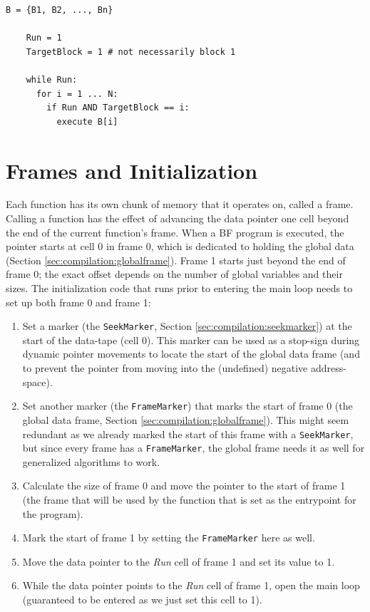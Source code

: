 \begin{lstfloat}[H]
  \begin{lstlisting}[style=pseudocode]
    B = {B1, B2, ..., Bn}

    Run = 1
    TargetBlock = 1 # not necessarily block 1

    while Run:
      for i = 1 ... N:
        if Run AND TargetBlock == i:
          execute B[i] 
  \end{lstlisting}
  \caption{Pseudocode of an Acus-generated program.}
  \label{lst:acusprogram}
\end{lstfloat}

\section{Frames and Initialization}
\label{sec:compilation:framesinit}
Each function has its own chunk of memory that it operates on, called a frame. Calling a function has the effect of advancing the data pointer one cell beyond the end of the current function's frame. When a BF program is executed, the pointer starts at cell 0 in frame 0, which is dedicated to holding the global data (Section \ref{sec:compilation:globalframe}). Frame 1 starts just beyond the end of frame 0; the exact offset depends on the number of global variables and their sizes. The initialization code that runs prior to entering the main loop needs to set up both frame 0 and frame 1:
%
\begin{enumerate}
\item Set a marker (the \texttt{SeekMarker}, Section \ref{sec:compilation:seekmarker}) at the start of the data-tape (cell 0). This marker can be used as a stop-sign during dynamic pointer movements to locate the start of the global data frame (and to prevent the pointer from moving into the (undefined) negative address-space).
\item Set another marker (the \texttt{FrameMarker}) that marks the start of frame 0 (the global data frame, Section \ref{sec:compilation:globalframe}). This might seem redundant as we already marked the start of this frame with a \texttt{SeekMarker}, but since every frame has a \texttt{FrameMarker}, the global frame needs it as well for generalized algorithms to work.
\item Calculate the size of frame 0 and move the pointer to the start of frame 1 (the frame that will be used by the function that is set as the entrypoint for the program). 
\item Mark the start of frame 1 by setting the \texttt{FrameMarker} here as well.
\item Move the data pointer to the \emph{Run} cell of frame 1 and set its value to 1.
\item While the data pointer points to the \emph{Run} cell of frame 1, open the main loop (guaranteed to be entered as we just set this cell to 1).
\end{enumerate}

